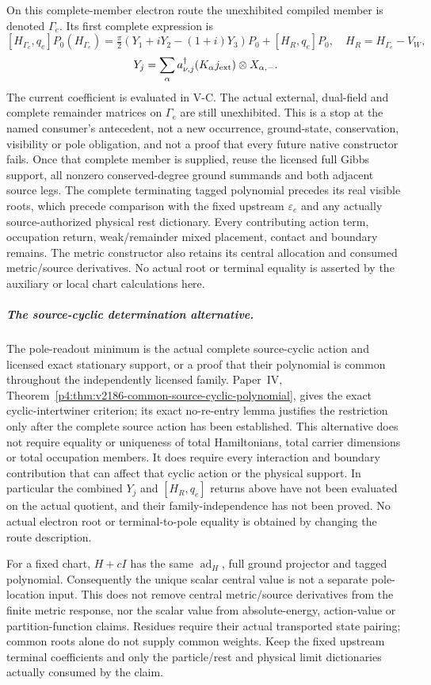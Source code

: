 \documentclass[11pt,a4paper]{article}
\begin{document}
On this complete-member electron route the unexhibited compiled member is denoted
$\Gamma_e$. Its first complete expression is
\[
 [H_{\Gamma_e},q_e]P_0(H_{\Gamma_e})
 =\tfrac\pi2(Y_1+iY_2-(1+i)Y_3)P_0+[H_R,q_e]P_0,
 \quad H_R=H_{\Gamma_e}-V_W,
\]
\[
 Y_j=\sum_\alpha a_{\nu,j}^\dagger(K_\alpha j_{\rm ext})
                                    \otimes X_{\alpha,-}.
\]
The current coefficient is evaluated in V-C. The actual external,
dual-field and complete remainder matrices on $\Gamma_e$ are still
unexhibited. This is a stop at the named consumer's antecedent, not a new
occurrence, ground-state, conservation, visibility or pole obligation, and
not a proof that every future native constructor fails.
Once that complete member is supplied, reuse the licensed full Gibbs support,
all nonzero conserved-degree ground summands and both adjacent source legs.
The complete terminating tagged polynomial precedes its real visible roots,
which precede comparison with the fixed upstream $\varepsilon_e$ and any
actually source-authorized physical rest dictionary. Every contributing action term,
occupation return, weak/remainder mixed placement, contact and boundary
remains.  The metric constructor also retains its central allocation and
consumed metric/source derivatives. No actual root or terminal equality is asserted
by the auxiliary or local chart calculations here.


\subparagraph{The source-cyclic determination alternative.}
The pole-readout minimum is the actual complete source-cyclic action and
licensed exact stationary support, or a proof that their polynomial is
common throughout the independently licensed family.  Paper~IV,
Theorem~\ref{p4:thm:v2186-common-source-cyclic-polynomial}, gives the exact
cyclic-intertwiner criterion; its exact no-re-entry lemma justifies the
restriction only after the complete source action has been established.
This alternative does not require equality or uniqueness of total
Hamiltonians, total carrier dimensions or total occupation members.  It
does require every interaction and boundary contribution that can affect
that cyclic action or the physical support.  In particular the combined
$Y_j$ and $[H_R,q_e]$ returns above have not been evaluated on the actual
quotient, and their family-independence has not been proved.  No actual
electron root or terminal-to-pole equality is obtained by changing the
route description.

For a fixed chart, $H+cI$ has the same $\operatorname{ad}_H$, full ground
projector and tagged polynomial.  Consequently the unique scalar central
value is not a separate pole-location input.  This does not remove central
metric/source derivatives from the finite metric response, nor the scalar
value from absolute-energy, action-value or partition-function claims.
Residues require their actual transported state pairing; common roots
alone do not supply common weights.  Keep the fixed upstream terminal
coefficients and only the particle/rest and physical limit dictionaries
actually consumed by the claim.
\end{document}
